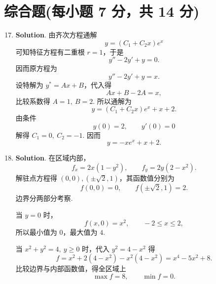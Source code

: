 \documentclass[../Main.tex]{subfiles}
\begin{document}
\section{综合题(每小题 7 分，共 14 分)}
\begin{enumerate}
    \setcounter{enumi}{16}
    \item \textbf{Solution}. 由齐次方程通解
          \[
              y=(C_1+C_2x)e^x
          \]
          可知特征方程有二重根 \(r=1\)，于是
          \[
              y''-2y'+y=0.
          \]
          因而原方程为
          \[
              y''-2y'+y=x.
          \]
          设特解为 \(y^*=Ax+B\)，代入得
          \[
              Ax+B-2A=x,
          \]
          比较系数得 \(A=1,\ B=2\). 所以通解为
          \[
              y=(C_1+C_2x)e^x+x+2.
          \]
          由条件
          \[
              y(0)=2,\qquad y'(0)=0
          \]
          解得 \(C_1=0,\ C_2=-1\). 因而
          \[
              y=-xe^x+x+2.
          \]

    \item \textbf{Solution}. 在区域内部，
          \[
              f_x=2x(1-y^2),\qquad f_y=2y(2-x^2).
          \]
          解驻点方程得 \((0,0),(\pm\sqrt2,1)\)，其函数值分别为
          \[
              f(0,0)=0,\qquad f(\pm\sqrt2,1)=2.
          \]
          边界分两部分考察.

          当 \(y=0\) 时，
          \[
              f(x,0)=x^2,\qquad -2\le x\le 2,
          \]
          所以最小值为 \(0\)，最大值为 \(4\).

          当 \(x^2+y^2=4,\ y\ge 0\) 时，代入 \(y^2=4-x^2\) 得
          \[
              f=x^2+2(4-x^2)-x^2(4-x^2)=x^4-5x^2+8.
          \]
          比较边界与内部函数值，得全区域上
          \[
              \max f=8,\qquad \min f=0.
          \]
\end{enumerate}
\end{document}
